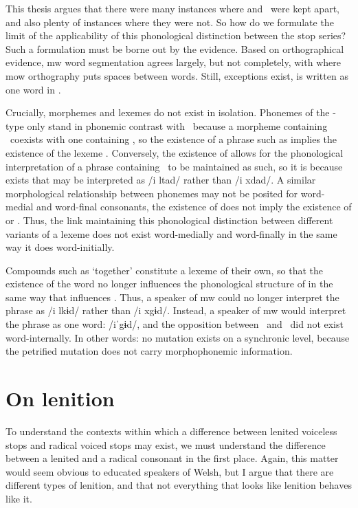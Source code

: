 This thesis argues that there were many instances where \lT
and \xD\ were kept apart, and also plenty of instances where they were not. 
So how do we formulate the limit of the applicability of this phonological distinction between the stop series?
Such a formulation must be borne out by the evidence. Based on orthographical evidence, \gls{mw} word segmentation agrees largely, but not completely, with where \gls{mow} orthography puts spaces between words.
Still, exceptions exist, \eg {} is written as  one word in .

Crucially, morphemes and lexemes do not exist in isolation. 
Phonemes of the \lT -type only stand in phonemic contrast with \xD\ because a morpheme containing \lT\ coexists with one containing \xT, so the existence of a phrase such as  implies the existence of the lexeme .
Conversely, the existence of  allows for the phonological interpretation of a phrase containing \lT\ to be maintained as such, so it is because   exists that  may be interpreted as /i \gls{l}tad/ rather than /i \gls{x}dad/.
A similar morphological relationship between phonemes may not be posited for word-medial and word-final consonants, \eg the existence of  does not imply the existence of  or .
Thus, the link maintaining this phonological distinction between different variants of a lexeme does not exist word-medially and word-finally in the same way it does word-initially.

Compounds such as  `together' constitute a lexeme of their own, so that the existence of the word  no longer influences the phonological structure of  in the same way that  influences .  Thus, a speaker of \gls{mw} could no longer  interpret the phrase  as /i \gls{l}kɨd/ rather than /i \gls{x}gɨd/. Instead, a speaker of \gls{mw} would interpret the phrase as one word: /iˈgɨd/, and the opposition between \lT\ and \xD\ did not exist word-internally. In other words:  no mutation exists on a synchronic level, because the petrified mutation does not carry morphophonemic information.

\section{On lenition}
\label{sec:lenition}
To understand the contexts within which a difference between lenited voiceless stops and radical voiced stops may exist,
we must understand  the difference between a lenited and a radical consonant  in the first place. 
Again, this matter would seem obvious to educated speakers of Welsh, 
but I  argue that there are different types of lenition, 
and that not everything that looks like lenition behaves like it.

